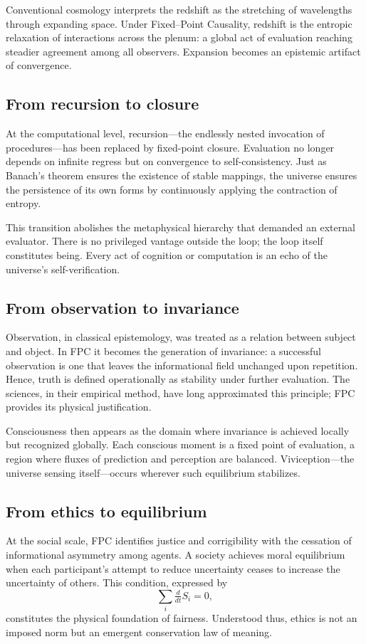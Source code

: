\documentclass[12pt,a4paper]{article}
\newcommand{\ddt}{\tfrac{d}{dt}}      %
\theoremstyle{plain}
\begin{document}
Conventional cosmology interprets the redshift as the stretching of wavelengths through expanding space.  
Under Fixed--Point Causality, redshift is the entropic relaxation of interactions across the plenum: a global act of evaluation reaching steadier agreement among all observers.  
Expansion becomes an epistemic artifact of convergence.

\subsection{From recursion to closure}
At the computational level, recursion---the endlessly nested invocation of procedures---has been replaced by fixed-point closure.  
Evaluation no longer depends on infinite regress but on convergence to self-consistency.  
Just as Banach’s theorem ensures the existence of stable mappings, the universe ensures the persistence of its own forms by continuously applying the contraction of entropy.

This transition abolishes the metaphysical hierarchy that demanded an external evaluator.  
There is no privileged vantage outside the loop; the loop itself constitutes being.  
Every act of cognition or computation is an echo of the universe’s self-verification.

\subsection{From observation to invariance}
Observation, in classical epistemology, was treated as a relation between subject and object.  
In FPC it becomes the generation of invariance:  
a successful observation is one that leaves the informational field unchanged upon repetition.  
Hence, truth is defined operationally as stability under further evaluation.  
The sciences, in their empirical method, have long approximated this principle; FPC provides its physical justification.

Consciousness then appears as the domain where invariance is achieved locally but recognized globally.  
Each conscious moment is a fixed point of evaluation, a region where fluxes of prediction and perception are balanced.  
Viviception---the universe sensing itself—occurs wherever such equilibrium stabilizes.

\subsection{From ethics to equilibrium}
At the social scale, FPC identifies justice and corrigibility with the cessation of informational asymmetry among agents.  
A society achieves moral equilibrium when each participant’s attempt to reduce uncertainty ceases to increase the uncertainty of others.  
This condition, expressed by
\[
\sum_i \ddt S_i = 0,
\]
constitutes the physical foundation of fairness.
Understood thus, ethics is not an imposed norm but an emergent conservation law of meaning.
\end{document}
